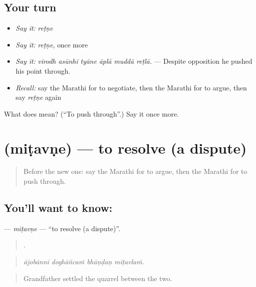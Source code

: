 \subsection*{Your turn}
\begin{itemize}
\raggedright
  \item \emph{Say it:} \emph{reṭṇe}
  \item \emph{Say it:} \emph{reṭṇe}, once more
  \item \emph{Say it:} \emph{virodh asūnhī tyāne āplā muddā reṭlā.} — Despite opposition he pushed his point through.
  \item \emph{Recall:} say the Marathi for to negotiate, then the Marathi for to argue, then say \emph{reṭṇe} again
\end{itemize}

\begin{tcolorbox}[breakable,colback=teal!4,colframe=teal!35!black,title={Before you move on}]
What does  mean? (\textquotedblleft{}To push through\textquotedblright{}.) Say it once more.
\end{tcolorbox}
\section[\texorpdfstring{\mr{मिटवणे} (miṭavṇe)}{मिटवणे (miṭavṇe)}]{ (miṭavṇe) — to resolve (a dispute)}

\label{lesson:MR-C365-mitavne}



\begin{quote}
Before the new one: say the Marathi for to argue, then the Marathi for to push through.
\end{quote}

\subsection*{You'll want to know: }
\textbf{} — \emph{miṭavṇe} — \textquotedblleft{}to resolve (a dispute)\textquotedblright{}.

\begin{quote}
   .
\end{quote}

\begin{quote}
\emph{ājobānnī doghāñcaṁ bhāṇḍaṇ miṭavlaṁ.}
\end{quote}

\begin{quote}
Grandfather settled the quarrel between the two.
\end{quote}

